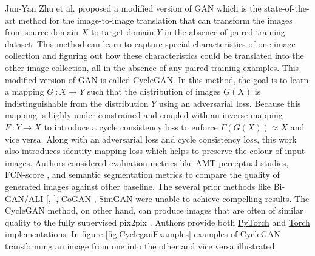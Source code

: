 Jun-Yan Zhu et al.\cite{zhu2020unpaired} proposed a modified version of \ac{GAN} which is the state-of-the-art method for the image-to-image translation that can transform the images from source domain $X$ to target domain $Y$ in the absence of paired training dataset. This method can learn to capture special characteristics of one image collection and figuring out how these characteristics could be translated into the other image collection, all in the absence of any paired training examples. This modified version of \ac{GAN} is called \ac{CycleGAN}. In this method, the goal is to learn a mapping $G\ \colon X \rightarrow Y$ such that the distribution of images $G(X)$ is indistinguishable from the distribution $Y$ using an adversarial loss. Because this mapping is highly under-constrained and coupled with an inverse mapping $F\ \colon Y \rightarrow X$ to introduce a cycle consistency loss to enforce $F(G(X))\approx X$ and vice versa. Along with an adversarial loss and cycle consistency loss, this work also introduces identity mapping loss which helps to preserve the colour of input images. Authors considered evaluation metrics like \ac{AMT} perceptual studies, FCN-score \cite{isola2018imagetoimage}, and semantic segmentation metrics to compare the quality of generated images against other baseline. The several prior methods like Bi-GAN/ALI [\cite{donahue2017adversarial}, \cite{dumoulin2017adversarially}], CoGAN \cite{liu2016coupled}, SimGAN \cite{shrivastava2017learning} were unable to achieve compelling results. The \ac{CycleGAN} method, on other hand, can produce images that are often of similar quality to the fully supervised pix2pix \cite{isola2018imagetoimage}. Authors provide both \href{https://github.com/junyanz/pytorch-CycleGAN-and-pix2pix}{PyTorch} and \href{https://github.com/junyanz/CycleGAN}{Torch} implementations. In figure \ref{fig:CycleganExamples} examples of \ac{CycleGAN} transforming an image from one into the other and vice versa illustrated.



